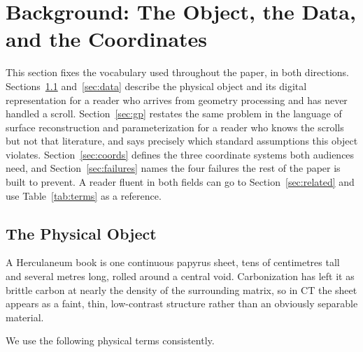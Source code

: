 \section{Background: The Object, the Data, and the Coordinates}
\label{sec:background}

This section fixes the vocabulary used throughout the paper, in both directions. Sections~\ref{sec:physical} and~\ref{sec:data} describe the physical object and its digital representation for a reader who arrives from geometry processing and has never handled a scroll. Section~\ref{sec:gp} restates the same problem in the language of surface reconstruction and parameterization for a reader who knows the scrolls but not that literature, and says precisely which standard assumptions this object violates. Section~\ref{sec:coords} defines the three coordinate systems both audiences need, and Section~\ref{sec:failures} names the four failures the rest of the paper is built to prevent. A reader fluent in both fields can go to Section~\ref{sec:related} and use Table~\ref{tab:terms} as a reference.

\subsection{The Physical Object}
\label{sec:physical}

A Herculaneum book is one continuous papyrus sheet, tens of centimetres tall and several metres long, rolled around a central void. Carbonization has left it as brittle carbon at nearly the density of the surrounding matrix, so in CT the sheet appears as a faint, thin, low-contrast structure rather than an obviously separable material.

We use the following physical terms consistently.

